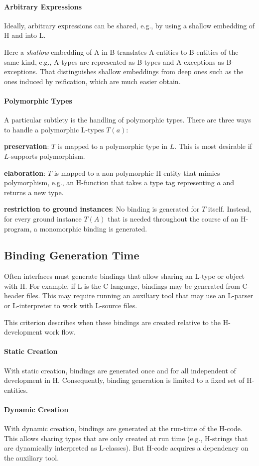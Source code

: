 \paragraph{Arbitrary Expressions}
Ideally, arbitrary expressions can be shared, e.g., by using a shallow embedding of H and into L.

Here a \emph{shallow} embedding of A in B translates A-entities to B-entities of the same kind, e.g., A-types are represented as B-types and A-exceptions as B-exceptions.
That distinguishes shallow embeddings from deep ones such as the ones induced by reification, which are much easier obtain.

\paragraph{Polymorphic Types}
A particular subtlety is the handling of polymorphic types.
There are three ways to handle a polymorphic L-types $T(a)$:
\begin{compactitem}
 \item \textbf{preservation}: $T$ is mapped to a polymorphic type in $L$. This is most desirable if $L$-supports polymorphism.
 \item \textbf{elaboration}: $T$ is mapped to a non-polymorphic H-entity that mimics polymorphism, e.g., an H-function that takes a type tag representing $a$ and returns a new type.
 \item \textbf{restriction to ground instances}: No binding is generated for $T$ itself.
   Instead, for every ground instance $T(A)$ that is needed throughout the course of an H-program, a monomorphic binding is generated.
\end{compactitem}

\subsection{Binding Generation Time}

Often interfaces must generate bindings that allow sharing an L-type or object with H.
For example, if L is the C language, bindings may be generated from C-header files.
This may require running an auxiliary tool that may use an L-parser or L-interpreter to work with L-source files.

This criterion describes when these bindings are created relative to the H-development work flow.

\paragraph{Static Creation}
With static creation, bindings are generated once and for all independent of development in H.
Consequently, binding generation is limited to a fixed set of H-entities.

\paragraph{Dynamic Creation}
With dynamic creation, bindings are generated at the run-time of the H-code.
This allows sharing types that are only created at run time (e.g., H-strings that are dynamically interpreted as L-classes).
But H-code acquires a dependency on the auxiliary tool.
